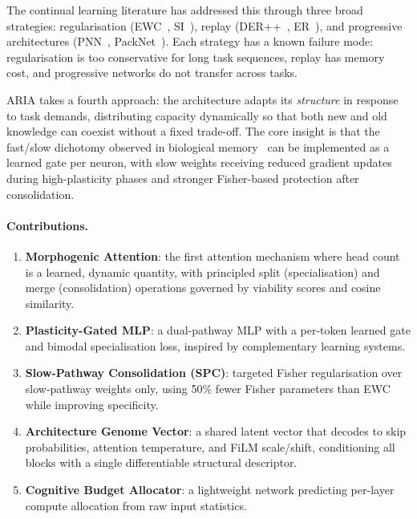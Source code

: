 \documentclass[10pt,twocolumn]{article}
\begin{document}
The continual learning literature has addressed this through three broad strategies:
regularisation (EWC~\citep{kirkpatrick2017overcoming}, SI~\citep{zenke2017continual}),
replay (DER++~\citep{buzzega2020dark}, ER~\citep{rolnick2019experience}), and
progressive architectures (PNN~\citep{rusu2016progressive}, PackNet~\citep{mallya2018packnet}).
Each strategy has a known failure mode: regularisation is too conservative for long task
sequences, replay has memory cost, and progressive networks do not transfer across tasks.

ARIA takes a fourth approach: the architecture adapts its \emph{structure} in response
to task demands, distributing capacity dynamically so that both new and old knowledge
can coexist without a fixed trade-off. The core insight is that the fast/slow dichotomy
observed in biological memory~\citep{mcclelland1995complementary} can be implemented
as a learned gate per neuron, with slow weights receiving reduced gradient updates
during high-plasticity phases and stronger Fisher-based protection after consolidation.

\paragraph{Contributions.}
\begin{enumerate}
  \item \textbf{Morphogenic Attention}: the first attention mechanism where head count
    is a learned, dynamic quantity, with principled split (specialisation) and merge
    (consolidation) operations governed by viability scores and cosine similarity.
  \item \textbf{Plasticity-Gated MLP}: a dual-pathway MLP with a per-token learned
    gate and bimodal specialisation loss, inspired by complementary learning systems.
  \item \textbf{Slow-Pathway Consolidation (SPC)}: targeted Fisher regularisation over
    slow-pathway weights only, using 50\% fewer Fisher parameters than EWC while
    improving specificity.
  \item \textbf{Architecture Genome Vector}: a shared latent vector that decodes to
    skip probabilities, attention temperature, and FiLM scale/shift, conditioning all
    blocks with a single differentiable structural descriptor.
  \item \textbf{Cognitive Budget Allocator}: a lightweight network predicting per-layer
    compute allocation from raw input statistics.
\end{enumerate}
\end{document}

